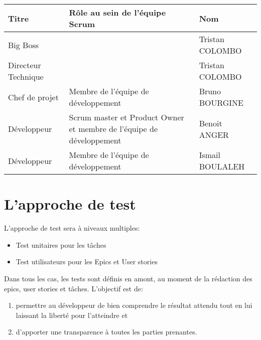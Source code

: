 \begin{tabular}{|l|p{8cm}|l|}
      \hline
      \rowcolor{orange} Titre & Rôle au sein de l'équipe Scrum & Nom \\
      \hline
      Big Boss & & Tristan COLOMBO \\
      \hline
      Directeur Technique & & Tristan COLOMBO \\
      \hline
      Chef de projet & Membre de l'équipe de développement & Bruno BOURGINE \\
      \hline
      Développeur & Scrum master et Product Owner et membre de l'équipe de développement & Benoit ANGER \\
      \hline
      Développeur & Membre de l'équipe de développement & Ismail BOULALEH \\    
      \hline  
\end{tabular}

\section{L'approche de test}

L’approche de test sera à niveaux multiples:
\begin{itemize}
      \item Test unitaires pour les tâches
      \item Test utilisateurs pour les Epics et User stories
\end{itemize}


Dans tous les cas, les tests sont définis en amont, au moment de la rédaction des epics, user stories et tâches.
L’objectif est de:

\begin{enumerate}
      \item permettre au développeur de bien comprendre le résultat attendu tout en lui laissant la liberté 
      pour l’atteindre et 
      \item d’apporter une transparence à toutes les parties prenantes.
\end{enumerate}

 
